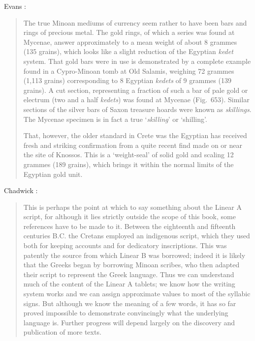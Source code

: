\documentclass{article}
\begin{document}
Evans \cite[pp.~664--665]{knossosIV2}:

\begin{quote}
The true Minoan mediums of currency seem rather 
to have been bars and rings of precious metal. The gold rings, of which
a series was found at Mycenae, answer approximately to a mean weight
of about 8 grammes (135 grains), which looks like a slight reduction of
the Egyptian {\em kedet} system. That gold bars were in use is demonstrated
by a complete example found in a Cypro-Minoan tomb at Old Salamis,
weighing 72 grammes (1,113 grains) corresponding
to 8 Egyptian {\em kedets} of 9 grammes (139 grains).
A cut section, representing a fraction of such a bar
of pale gold or electrum (two and a half {\em kedets}) was
found at Mycenae (Fig.~653). Similar sections of the
silver bars of Saxon treasure hoards were known as
{\em skillings}. The Mycenae specimen is in fact a true
`{\em skilling}' or `shilling'.

That, however, the older standard in Crete was the
Egyptian has received fresh and striking confirmation
from a quite recent find made on or near the site of
Knossos. This is a `weight-seal' of solid gold and
scaling 12 grammes (189 grains), which brings it
within the normal limits of the Egyptian gold unit.
\end{quote}








Chadwick \cite[pp.~xi--xii]{chadwick}:

\begin{quote}
This is perhaps the point at which to say something about the Linear A
script, for although it lies strictly outside the scope of this book, some
references have to be made to it. Between the eighteenth and fifteenth
centuries B.C. the Cretans employed an indigenous script, which they used
both for keeping accounts and for dedicatory inscriptions. This was
patently the source from which Linear B was borrowed; indeed it is likely
that the Greeks began by borrowing Minoan scribes, who then adapted
their script to represent the Greek language. Thus we can understand
much of the content of the Linear A tablets; we know how the writing
system works and we can assign approximate values to most of the syllabic
signs. But although we know the meaning of a few words, it has so far
proved impossible to demonstrate convincingly what the underlying
language is. Further progress will depend largely on the discovery and
publication of more texts.
\end{quote}
\end{document}
